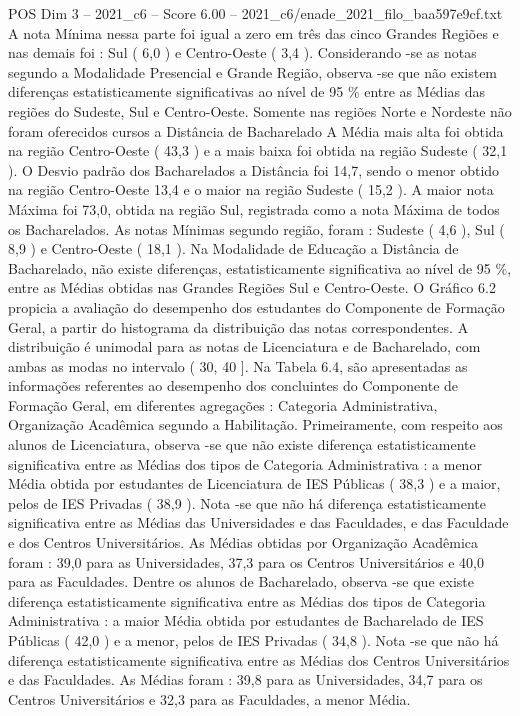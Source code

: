 \begin{textsample}{POS Dim 3 – 2021\_c6 – Score 6.00 – 2021\_c6/enade\_2021\_filo\_baa597e9cf.txt}
A nota Mínima nessa parte foi igual a zero em três das cinco Grandes Regiões e nas demais foi : Sul ( 6,0 ) e Centro-Oeste ( 3,4 ).
Considerando -se as notas segundo a Modalidade Presencial e Grande Região, observa -se que não existem diferenças estatisticamente significativas ao nível de 95 \% entre as Médias das regiões do Sudeste, Sul e Centro-Oeste.
Somente nas regiões Norte e Nordeste não foram oferecidos cursos a Distância de Bacharelado A Média mais alta foi obtida na região Centro-Oeste ( 43,3 ) e a mais baixa foi obtida na região Sudeste ( 32,1 ).
O Desvio padrão dos Bacharelados a Distância foi 14,7, sendo o menor obtido na região Centro-Oeste 13,4 e o maior na região Sudeste ( 15,2 ).
A maior nota Máxima foi 73,0, obtida na região Sul, registrada como a nota Máxima de todos os Bacharelados.
As notas Mínimas segundo região, foram : Sudeste ( 4,6 ), Sul ( 8,9 ) e Centro-Oeste ( 18,1 ).
Na Modalidade de Educação a Distância de Bacharelado, não existe diferenças, estatisticamente significativa ao nível de 95 \%, entre as Médias obtidas nas Grandes Regiões Sul e Centro-Oeste.
O Gráfico 6.2 propicia a avaliação do desempenho dos estudantes do Componente de Formação Geral, a partir do histograma da distribuição das notas correspondentes.
A distribuição é unimodal para as notas de Licenciatura e de Bacharelado, com ambas as modas no intervalo ( 30, 40 ].
Na Tabela 6.4, são apresentadas as informações referentes ao desempenho dos concluintes do Componente de Formação Geral, em diferentes agregações : Categoria Administrativa, Organização Acadêmica segundo a Habilitação.
Primeiramente, com respeito aos alunos de Licenciatura, observa -se que não existe diferença estatisticamente significativa entre as Médias dos tipos de Categoria Administrativa : a menor Média obtida por estudantes de Licenciatura de IES Públicas ( 38,3 ) e a maior, pelos de IES Privadas ( 38,9 ).
Nota -se que não há diferença estatisticamente significativa entre as Médias das Universidades e das Faculdades, e das Faculdade e dos Centros Universitários.
As Médias obtidas por Organização Acadêmica foram : 39,0 para as Universidades, 37,3 para os Centros Universitários e 40,0 para as Faculdades.
Dentre os alunos de Bacharelado, observa -se que existe diferença estatisticamente significativa entre as Médias dos tipos de Categoria Administrativa : a maior Média obtida por estudantes de Bacharelado de IES Públicas ( 42,0 ) e a menor, pelos de IES Privadas ( 34,8 ).
Nota -se que não há diferença estatisticamente significativa entre as Médias dos Centros Universitários e das Faculdades.
As Médias foram : 39,8 para as Universidades, 34,7 para os Centros Universitários e 32,3 para as Faculdades, a menor Média.

\end{textsample}
